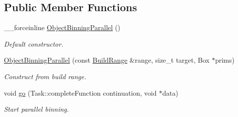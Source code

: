 \subsection*{Public Member Functions}
\begin{DoxyCompactItemize}
\item 
\_\-\_\-forceinline \hyperlink{classembree_1_1_object_binning_parallel_a342fe4274d9209490ef655a6880c2ea5}{ObjectBinningParallel} ()
\begin{DoxyCompactList}\small\item\em Default constructor. \item\end{DoxyCompactList}\item 
\hyperlink{classembree_1_1_object_binning_parallel_a4245a8d00124f419e23885e0c4d51f2b}{ObjectBinningParallel} (const \hyperlink{structembree_1_1_build_range}{BuildRange} \&range, size\_\-t target, Box $\ast$prims)
\begin{DoxyCompactList}\small\item\em Construct from build range. \item\end{DoxyCompactList}\item 
void \hyperlink{classembree_1_1_object_binning_parallel_a2b861c82ba2da2702206090fd3318ccb}{go} (Task::completeFunction continuation, void $\ast$data)
\begin{DoxyCompactList}\small\item\em Start parallel binning. \item\end{DoxyCompactList}\end{DoxyCompactItemize}
